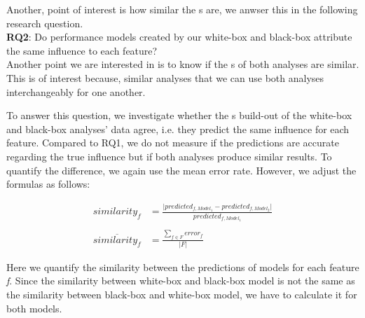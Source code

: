 Another, point of interest is how similar the {\perfInfluenceModel}s are, we anwser this in the following research question.\\

\noindent \textbf{RQ2}: Do performance models created by our white-box and black-box attribute the same influence to each feature?\\

Another point we are interested in is to know if the {\perfInfluenceModel}s of both analyses are similar.
This is of interest because, similar analyses that we can use both analyses interchangeably for one another.

To answer this question, we investigate whether the {\perfInfluenceModel}s build-out of the white-box and black-box analyses' data agree, i.e.
they predict the same influence for each feature. 
Compared to RQ1, we do not measure if the predictions are accurate regarding the true influence but if both analyses produce similar results. 
To quantify the difference, we again use the mean error rate. However, we adjust the formulas as follows:

\begin{align}
    similarity_f &= \frac{\lvert predicted_{f, Model_1} - predicted_{f, Model_2} \rvert}{predicted_{f, Model_1}} \label{equ:APE_RQ1} \\ \nonumber \\
    \overline{similarity_f}  &= \frac{\sum_{f \in F} error_f}{\lvert F \rvert} \label{equ:MAPE_RQ1}
\end{align}

Here we quantify the similarity between the predictions of models for each feature \emph{f}. Since the similarity between
white-box and black-box model is not the same as the similarity between black-box and white-box model, we have to calculate it for both models.

